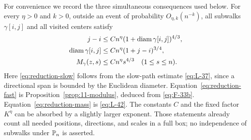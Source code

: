 For convenience we record the three simultaneous consequences used below. For every $\eta>0$ and $k>0$, outside an event of probability $O_{\eta,k}(n^{-k})$, all subwalks $\gamma[i,j]$ and all visited centers satisfy
\begin{align}
 j-i&\le C n^\eta(1+\operatorname{diam}\gamma[i,j])^{4/3},\label{eq:reduction-slow}\\
 \operatorname{diam}\gamma[i,j]&\le C n^\eta(1+j-i)^{3/4},\label{eq:reduction-fast}\\
 M_\gamma(z,s)&\le C n^\eta s^{4/3}\quad(1\le s\le n).
 \label{eq:reduction-mass}
\end{align}
Here \eqref{eq:reduction-slow} follows from the slow-path estimate \eqref{eq:L-37}, since a directional span is bounded by the Euclidean diameter. Equation~\eqref{eq:reduction-fast} is Proposition~\ref{prop:11-modulus}, deduced from \eqref{eq:F-33b}. Equation~\eqref{eq:reduction-mass} is \eqref{eq:L-42}. The constants $C$ and the fixed factor $K^\eta$ can be absorbed by a slightly larger exponent. Those statements already count all needed positions, directions, and scales in a full box; no independence of subwalks under $\mathbb P_n$ is asserted.

